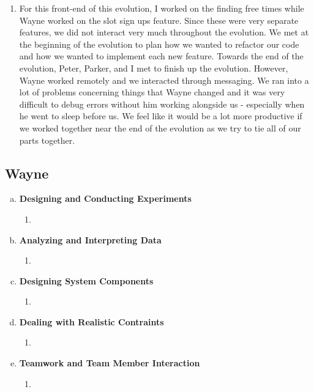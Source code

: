 \documentclass[11pt]{article}   %
\begin{document}
\begin{enumerate} [a)]
\begin{enumerate} [$\cdot$]
\item For this front-end of this evolution, I worked on the finding free times while Wayne worked on the slot sign ups feature. Since these were very separate features, we did not interact very much throughout the evolution. We met at the beginning of the evolution to plan how we wanted to refactor our code and how we wanted to implement each new feature. Towards the end of the evolution, Peter, Parker, and I met to finish up the evolution. However, Wayne worked remotely and we interacted through messaging. We ran into a lot of problems concerning things that Wayne changed and it was very difficult to debug errors without him working alongside us - especially when he went to sleep before us. We feel like it would be a lot more productive if we worked together near the end of the evolution as we try to tie all of our parts together.
\end{enumerate}
\end{enumerate}

\subsection*{Wayne}

\begin{enumerate} [a)]
\item  {\bf Designing and Conducting Experiments}
\begin{enumerate} [$\cdot$]
\item 
\end{enumerate}
\item  {\bf Analyzing and Interpreting Data}
\begin{enumerate} [$\cdot$]
\item  
\end{enumerate}
\item {\bf Designing System Components}
\begin{enumerate} [$\cdot$]
\item 
\end{enumerate}
\item {\bf Dealing with Realistic Contraints}
\begin{enumerate} [$\cdot$]
\item 
\end{enumerate}
\item  {\bf Teamwork and Team Member Interaction}
\begin{enumerate} [$\cdot$]
\item 
\end{enumerate}
\end{enumerate}
\end{document}
